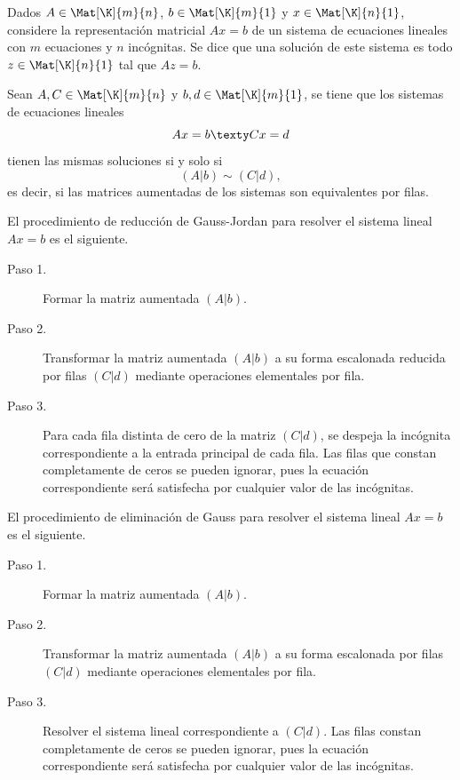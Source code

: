 \documentclass[compacto,10pt]{pubciencias-notas}
\begin{document}
\begin{defi}
Dados $A\in\Mat[\K]{m}{n}$, $b \in\Mat[\K]{m}{1}$ y $x \in\Mat[\K]{n}{1}$, considere la representación matricial $Ax = b$ de un sistema de ecuaciones lineales con $m$ ecuaciones y $n$ incógnitas. 
Se dice que una solución de este sistema es todo $z\in\Mat[\K]{n}{1}$ tal que $Az=b$.
\end{defi}

\begin{teo}
    Sean $A,C\in \Mat[\K]{m}{n}$ y $b,d\in \Mat[\K]{m}{1}$, se tiene que los sistemas de ecuaciones lineales
    \[
        Ax=b
        \texty
        Cx=d
    \]
    tienen las mismas soluciones si y solo si
    \[
        (A|b)\sim (C|d),
    \]
    es decir, si las matrices aumentadas de los sistemas son equivalentes por filas. 
\end{teo}

\noindent El procedimiento de reducción de Gauss-Jordan para resolver el sistema lineal $Ax = b$ es el siguiente.

\begin{description}
\item[Paso 1.] Formar la matriz aumentada $(A|b)$.
\item[Paso 2.] Transformar la matriz aumentada $(A|b)$ a su forma escalonada reducida por filas $(C|d)$ mediante operaciones elementales por fila.
\item[Paso 3.] Para cada fila distinta de cero de la matriz $(C|d)$, se despeja la incógnita correspondiente a la entrada principal de cada fila. Las filas que constan completamente de ceros se pueden ignorar, pues la ecuación correspondiente será satisfecha por cualquier valor de las incógnitas.
\end{description}

\noindent El procedimiento de eliminación de Gauss para resolver el sistema lineal $Ax = b$ es el siguiente.
\begin{description}
\item[Paso 1.] Formar la matriz aumentada $(A|b)$.
\item[Paso 2.] Transformar la matriz aumentada $(A|b)$ a su forma escalonada por filas $(C|d)$ mediante operaciones elementales por fila.
\item[Paso 3.] Resolver el sistema lineal correspondiente a $(C|d)$. Las filas constan completamente de ceros se pueden ignorar, pues la ecuación correspondiente será satisfecha por cualquier valor de las incógnitas.
\end{description}
\end{document}
